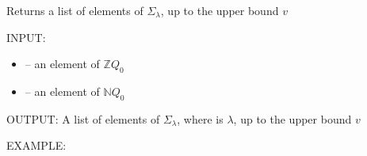 \documentclass[letterpaper,10pt,english]{sphinxmanual}
\begin{document}
\begin{fulllineitems}
\label{\detokenize{index:quivercombinatorics.quivercombinatorics.Quiver.sigma_lambda}}
\pysigstartsignatures
\pysiglinewithargsret
{}
{\sphinxparamcomma {}}
{}
\pysigstopsignatures
\sphinxAtStartPar
Returns a list of elements of \(\Sigma_\lambda\), up to the upper bound \(v\)

\sphinxAtStartPar
INPUT:
\begin{itemize}
\item {} 
\sphinxAtStartPar
{} – an element of \(\mathbb{Z}Q_0\)

\item {} 
\sphinxAtStartPar
{} – an element of \(\mathbb{N}Q_0\)

\end{itemize}

\sphinxAtStartPar
OUTPUT: A list of elements of \(\Sigma_\lambda\), where  is \(\lambda\), up to the upper bound \(v\)

\sphinxAtStartPar
EXAMPLE:

\begin{sphinxVerbatim}[commandchars=\\\{\}]
  
   \PYG{p}{[}\PYG{p}{[} \PYG{p}{]} \PYG{p}{[} \PYG{p}{]}\PYG{p}{]}
    
\PYG{p}{[} \PYG{p}{]}
\end{sphinxVerbatim}

\end{fulllineitems}
\end{document}
